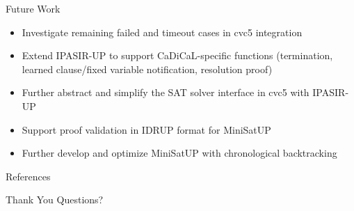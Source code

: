 \documentclass{beamer}
\begin{document}
\begin{frame}{Future Work}
  \begin{itemize}
    \item Investigate remaining failed and timeout cases in cvc5 integration
    \item Extend IPASIR-UP to support CaDiCaL-specific functions (termination, learned clause/fixed variable notification, resolution proof)
    \item Further abstract and simplify the SAT solver interface in cvc5 with IPASIR-UP
    \item Support proof validation in IDRUP format for MiniSatUP
    \item Further develop and optimize MiniSatUP with chronological backtracking
  \end{itemize}
\end{frame}

\begin{frame}[allowframebreaks]{References}
  \scriptsize
  \nocite{*}
  
  
\end{frame}

\begin{frame}{Thank You}
  Questions?
\end{frame}
\end{document}
